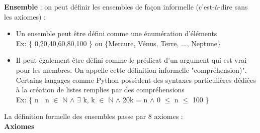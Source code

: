 \textbf{Ensemble} : on peut définir les ensembles de façon informelle (c'est-à-dire sans les axiomes) : \\
\begin{itemize}
\item Un ensemble peut être défini comme une énumération d'éléments \\
Ex: \{ 0,20,40,60,80,100 \} ou \{Mercure, Vénus, Terre, ..., Neptune\}
\item Il peut également être défini comme le prédicat d'un argument qui est vrai pour les membres. On appelle cette définition informelle "compréhension)". Certains langages comme Python possèdent des syntaxes particulières dédiées à la création de listes remplies par des compréhensions\\
Ex: \{ n | n $\in$ $\mathbb{N}$ $\wedge$ $\exists$ k, k $\in$ $\mathbb{N}$ $\wedge$ 20k = n $\wedge$ 0 $\leq$ n $\leq$ 100 \} \\
\end{itemize}
La définition formelle des ensembles passe par 8 axiomes :
\\
\textbf{Axiomes} \\


